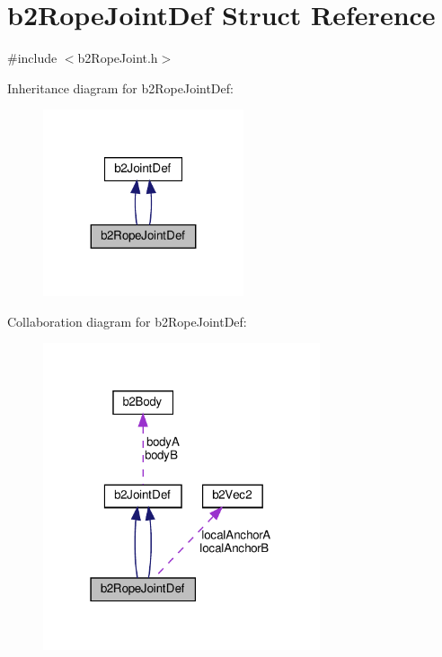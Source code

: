 \hypertarget{structb2RopeJointDef}{}\section{b2\+Rope\+Joint\+Def Struct Reference}
\label{structb2RopeJointDef}


{\ttfamily \#include $<$b2\+Rope\+Joint.\+h$>$}



Inheritance diagram for b2\+Rope\+Joint\+Def\+:
\nopagebreak
\begin{figure}[H]
\begin{center}
\leavevmode
\includegraphics[width=167pt]{structb2RopeJointDef__inherit__graph}
\end{center}
\end{figure}


Collaboration diagram for b2\+Rope\+Joint\+Def\+:
\nopagebreak
\begin{figure}[H]
\begin{center}
\leavevmode
\includegraphics[width=231pt]{structb2RopeJointDef__coll__graph}
\end{center}
\end{figure}
